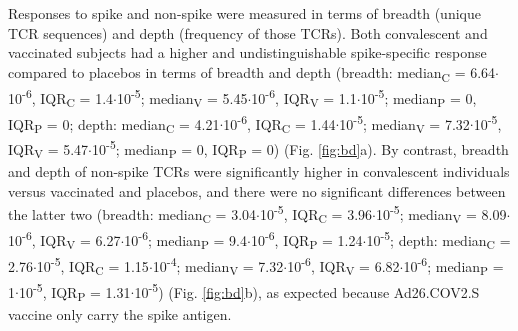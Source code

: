 Responses to \covid{} spike and non-spike were measured in terms of breadth (unique TCR sequences) and depth (frequency of those TCRs). Both convalescent and vaccinated subjects had a higher and undistinguishable spike-specific response compared to placebos in terms of breadth and depth (breadth: median\textsubscript{C} = 6.64$\cdot$10\textsuperscript{-6}, IQR\textsubscript{C} = 1.4$\cdot$10\textsuperscript{-5}; median\textsubscript{V} = 5.45$\cdot$10\textsuperscript{-6}, IQR\textsubscript{V} = 1.1$\cdot$10\textsuperscript{-5}; median\textsubscript{P} = 0, IQR\textsubscript{P} = 0; depth: median\textsubscript{C} = 4.21$\cdot$10\textsuperscript{-6}, IQR\textsubscript{C} = 1.44$\cdot$10\textsuperscript{-5}; median\textsubscript{V} = 7.32$\cdot$10\textsuperscript{-5}, IQR\textsubscript{V} = 5.47$\cdot$10\textsuperscript{-5}; median\textsubscript{P} = 0, IQR\textsubscript{P} = 0) (Fig. \ref{fig:bd}a). By contrast, breadth and depth of non-spike TCRs were significantly higher in convalescent individuals versus vaccinated and placebos, and there were no significant differences between the latter two (breadth: median\textsubscript{C} = 3.04$\cdot$10\textsuperscript{-5}, IQR\textsubscript{C} = 3.96$\cdot$10\textsuperscript{-5}; median\textsubscript{V} = 8.09$\cdot$10\textsuperscript{-6}, IQR\textsubscript{V} = 6.27$\cdot$10\textsuperscript{-6}; median\textsubscript{P} = 9.4$\cdot$10\textsuperscript{-6}, IQR\textsubscript{P} = 1.24$\cdot$10\textsuperscript{-5}; depth: median\textsubscript{C} = 2.76$\cdot$10\textsuperscript{-5}, IQR\textsubscript{C} = 1.15$\cdot$10\textsuperscript{-4}; median\textsubscript{V} = 7.32$\cdot$10\textsuperscript{-6}, IQR\textsubscript{V} = 6.82$\cdot$10\textsuperscript{-6}; median\textsubscript{P} = 1$\cdot$10\textsuperscript{-5}, IQR\textsubscript{P} = 1.31$\cdot$10\textsuperscript{-5})
 (Fig. \ref{fig:bd}b), as expected because Ad26.COV2.S vaccine only carry the spike antigen.



